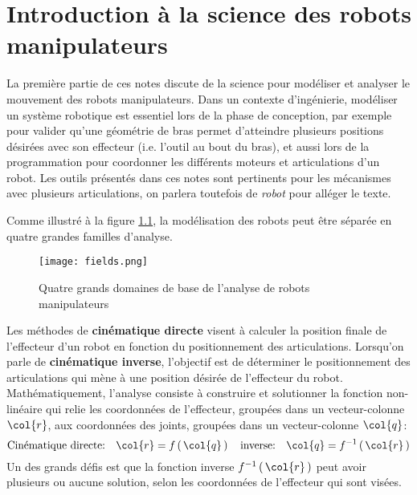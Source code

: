 \chapter{Introduction à la science des robots manipulateurs}

La première partie de ces notes discute de la science pour modéliser et analyser le mouvement des robots manipulateurs. Dans un contexte d'ingénierie, modéliser un système robotique est essentiel lors de la phase de conception, par exemple pour valider qu'une géométrie de bras permet d'atteindre plusieurs positions désirées avec son effecteur (i.e. l'outil au bout du bras), et aussi lors de la programmation pour coordonner les différents moteurs et articulations d'un robot. Les outils présentés dans ces notes sont pertinents pour les mécanismes avec plusieurs articulations, on parlera toutefois de \textit{robot} pour alléger le texte.


Comme illustré à la figure \ref{fig:fields}, la modélisation des robots peut être séparée en quatre grandes familles d'analyse.

\begin{figure}[H]
	\centering
		\texttt{[image: fields.png]}
	\caption{Quatre grands domaines de base de l'analyse de robots manipulateurs  }
	\label{fig:fields}
\end{figure}

Les méthodes de \textbf{cinématique directe} visent à calculer la position finale de l'effecteur d'un robot en fonction du positionnement des articulations. Lorsqu'on parle de \textbf{cinématique inverse}, l'objectif est de déterminer le positionnement des articulations qui mène à une position désirée de l'effecteur du robot. Mathématiquement, l'analyse consiste à construire et solutionner la fonction non-linéaire qui relie les coordonnées de l'effecteur, groupées dans un vecteur-colonne $\col{r}$, aux coordonnées des joints, groupées dans un vecteur-colonne $\col{q}$:
\begin{equation}
\text{Cinématique directe:}  \quad \col{r} = f\left( \, \col{q} \, \right)  \quad  \text{inverse:} \quad \col{q} = f^{-1}\left( \, \col{r}  \, \right) 
\end{equation}
Un des grands défis est que la fonction inverse $f^{-1}\left( \, \col{r}  \, \right)$ peut avoir plusieurs ou aucune solution, selon les coordonnées de l'effecteur qui sont visées. 

